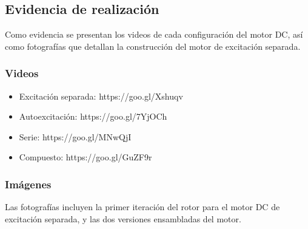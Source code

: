 
\subsection{Evidencia de realizaci\'on}
Como evidencia se presentan los videos de cada configuraci\'on del motor DC, as\'i como fotograf\'ias que 
detallan la construcci\'on del motor de excitaci\'on separada.

\subsubsection{Videos}
\begin{itemize}
 \item Excitaci\'on separada: https://goo.gl/Xshuqv
 \item Autoexcitaci\'on: https://goo.gl/7YjOCh
 \item Serie: https://goo.gl/MNwQjI
 \item Compuesto: https://goo.gl/GuZF9r
\end{itemize}

\subsubsection{Im\'agenes}
Las fotograf\'ias incluyen la primer iteraci\'on del rotor para el motor DC de excitaci\'on separada,
y las dos versiones ensambladas del motor.

